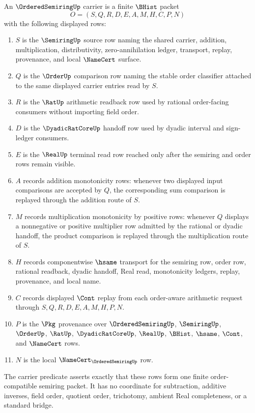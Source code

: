 \begin{definition}
\label{def:ordered-semiring-bhist-carrier}
An $\OrderedSemiringUp$ carrier is a finite $\BHist$ packet
$$
O=(S,Q,R,D,E,A,M,H,C,P,N)
$$
with the following displayed rows:
\begin{enumerate}
\item $S$ is the $\SemiringUp$ source row naming the shared carrier, addition, multiplication, distributivity, zero-annihilation ledger, transport, replay, provenance, and local $\NameCert$ surface.
\item $Q$ is the $\OrderUp$ comparison row naming the stable order classifier attached to the same displayed carrier entries read by $S$.
\item $R$ is the $\RatUp$ arithmetic readback row used by rational order-facing consumers without importing field order.
\item $D$ is the $\DyadicRatCoreUp$ handoff row used by dyadic interval and sign-ledger consumers.
\item $E$ is the $\RealUp$ terminal read row reached only after the semiring and order rows remain visible.
\item $A$ records addition monotonicity rows: whenever two displayed input comparisons are accepted by $Q$, the corresponding sum comparison is replayed through the addition route of $S$.
\item $M$ records multiplication monotonicity by positive rows: whenever $Q$ displays a nonnegative or positive multiplier row admitted by the rational or dyadic handoff, the product comparison is replayed through the multiplication route of $S$.
\item $H$ records componentwise $\hsame$ transport for the semiring row, order row, rational readback, dyadic handoff, Real read, monotonicity ledgers, replay, provenance, and local name.
\item $C$ records displayed $\Cont$ replay from each order-aware arithmetic request through $S,Q,R,D,E,A,M,H,P,N$.
\item $P$ is the $\Pkg$ provenance over $\OrderedSemiringUp$, $\SemiringUp$, $\OrderUp$, $\RatUp$, $\DyadicRatCoreUp$, $\RealUp$, $\BHist$, $\hsame$, $\Cont$, and $\NameCert$ rows.
\item $N$ is the local $\NameCert_{\OrderedSemiringUp}$ row.
\end{enumerate}
The carrier predicate asserts exactly that these rows form one finite order-compatible semiring packet. It has no coordinate for subtraction, additive inverses, field order, quotient order, trichotomy, ambient Real completeness, or a standard bridge.
\end{definition}

